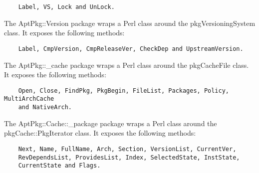 \documentclass[]{article}
\begin{document}
\begin{verbatim}
    Label, VS, Lock and UnLock.
\end{verbatim}


The AptPkg::Version package wraps a Perl class around the
pkgVersioningSystem class. It exposes the following methods:

\begin{verbatim}
    Label, CmpVersion, CmpReleaseVer, CheckDep and UpstreamVersion.
\end{verbatim}


The AptPkg::\_cache package wraps a Perl class around the pkgCacheFile
class. It exposes the following methods:

\begin{verbatim}
    Open, Close, FindPkg, PkgBegin, FileList, Packages, Policy, MultiArchCache
    and NativeArch.
\end{verbatim}


The AptPkg::Cache::\_package package wraps a Perl class around the
pkgCache::PkgIterator class. It exposes the following methods:

\begin{verbatim}
    Next, Name, FullName, Arch, Section, VersionList, CurrentVer,
    RevDependsList, ProvidesList, Index, SelectedState, InstState,
    CurrentState and Flags.
\end{verbatim}

\end{document}
